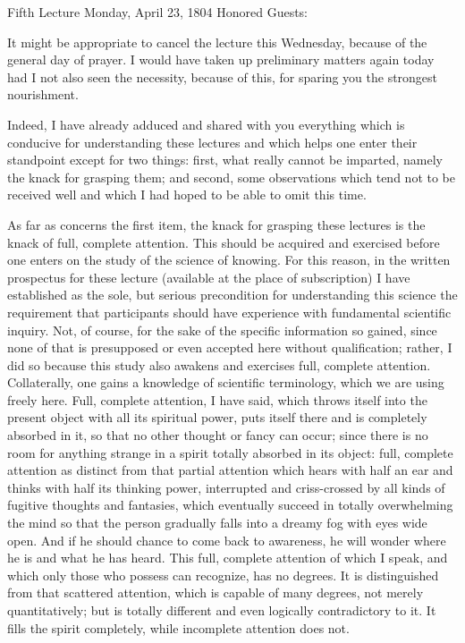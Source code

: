 Fifth Lecture
Monday, April 23, 1804
Honored Guests:

It might be appropriate to cancel the lecture this Wednesday,
because of the general day of prayer.
I would have taken up preliminary matters again today
had I not also seen the necessity, because of this,
for sparing you the strongest nourishment.

Indeed, I have already adduced and shared with you
everything which is conducive for understanding these lectures
and which helps one enter their standpoint except for two things:
first, what really cannot be imparted,
namely the knack for grasping them;
and second, some observations which tend
not to be received well and which
I had hoped to be able to omit this time.

As far as concerns the first item,
the knack for grasping these lectures is
the knack of full, complete attention.
This should be acquired and exercised
before one enters on the study of the science of knowing.
For this reason, in the written prospectus for these lecture
(available at the place of subscription)
I have established as the sole, but serious precondition
for understanding this science the requirement
that participants should have experience with
fundamental scientific inquiry.
Not, of course, for the sake of
the specific information so gained,
since none of that is presupposed
or even accepted here without qualification;
rather, I did so because this study also
awakens and exercises full, complete attention.
Collaterally, one gains a knowledge of scientific terminology,
which we are using freely here.
Full, complete attention, I have said,
which throws itself into the present object
with all its spiritual power,
puts itself there and is completely absorbed in it,
so that no other thought or fancy can occur;
since there is no room for anything strange
in a spirit totally absorbed in its object:
full, complete attention as distinct
from that partial attention
which hears with half an ear
and thinks with half its thinking power,
interrupted and criss-crossed by
all kinds of fugitive thoughts and fantasies,
which eventually succeed in totally overwhelming
the mind so that the person gradually falls
into a dreamy fog with eyes wide open.
And if he should chance to come back to awareness,
he will wonder where he is and what he has heard.
This full, complete attention of which I speak,
and which only those who possess can recognize, has no degrees.
It is distinguished from that scattered attention,
which is capable of many degrees, not merely quantitatively;
but is totally different and even logically contradictory to it.
It fills the spirit completely,
while incomplete attention does not.


